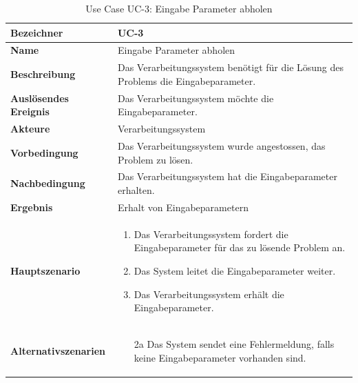 \begin{table}[ht]
\centering
  \begin{tabular}{ l | p{10cm} }
	\hline
	\rowcolor{gray}
	\textbf{Bezeichner}	&	\textbf{UC-3}\\ \hline
	\textbf{Name}			&	Eingabe Parameter abholen\\ \hline
	\textbf{Beschreibung}	&	Das Verarbeitungssystem benötigt für die Lösung des Problems die Eingabeparameter.\\ \hline
	\textbf{Auslösendes Ereignis}&	Das Verarbeitungssystem möchte die Eingabeparameter.\\ \hline
	\textbf{Akteure}		&	Verarbeitungssystem\\ \hline
	\textbf{Vorbedingung}	&	Das Verarbeitungssystem wurde angestossen, das Problem zu lösen.\\ \hline
	\textbf{Nachbedingung}	&	Das Verarbeitungssystem hat die Eingabeparameter erhalten.\\ \hline
	\textbf{Ergebnis}		&	Erhalt von Eingabeparametern\\ \hline
	\textbf{Hauptszenario}	&	\begin{enumerate}
					\item Das Verarbeitungssystem fordert die Eingabeparameter für das zu lösende Problem an.
					\item Das System leitet die Eingabeparameter weiter.
					\item Das Verarbeitungssystem erhält die Eingabeparameter.
					\end{enumerate}
					\\ \hline
	\textbf{Alternativszenarien}	&	\begin{enumerate}
					\item[2a] Das System sendet eine Fehlermeldung, falls keine Eingabeparameter vorhanden sind.
					\end{enumerate}
					\\ \hline
  \end{tabular}
   \caption{Use Case UC-3: Eingabe Parameter abholen}\label{table:use_case_3}
\end{table}


